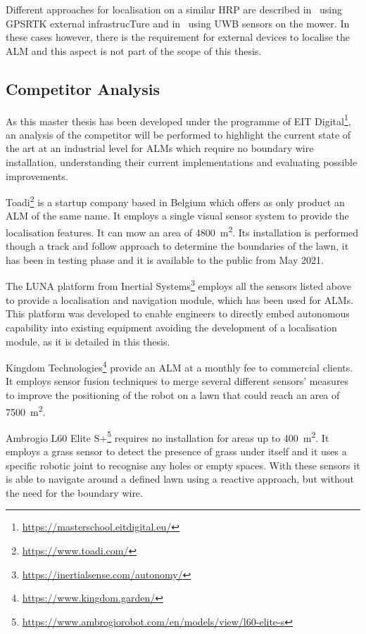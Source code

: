Different approaches for localisation on a similar \gls{HRP} are described in~\cite{oden_localization_2017} using \gls{GPSRTK} external infrastrucTure and in~\cite{lensund_local_2018} using \gls{UWB} sensors on the mower.
In these cases however, there is the requirement for external devices to localise the \gls{ALM} and this aspect is not part of the scope of this thesis. 


\subsection{Competitor Analysis}

\noindent As this master thesis has been developed under the programme of EIT Digital\footnote{\url{https://masterschool.eitdigital.eu/}}, an analysis of the competitor will be performed to highlight the current state of the art at an industrial level for \gls{ALM}s which require no boundary wire installation, understanding their current implementations and evaluating possible improvements.

Toadi\footnote{\url{https://www.toadi.com/}} is a startup company based in Belgium which offers as only product an \gls{ALM} of the same name. It employs a single visual sensor system to provide the localisation features. It can mow an area of \SI{4800}{\meter\squared}.
Its installation is performed though a track and follow approach to determine the boundaries of the lawn, it has been in testing phase and it is available to the public from May 2021.

The LUNA platform from Inertial Systems\footnote{\url{https://inertialsense.com/autonomy/}} employs all the sensors listed above to provide a localisation and navigation module, which has been used for \gls{ALM}s. This platform was developed to enable engineers to directly embed autonomous capability into existing equipment avoiding the development of a localisation module, as it is detailed in this thesis.

Kingdom Technologies\footnote{\url{https://www.kingdom.garden/}} provide an \gls{ALM} at a monthly fee to commercial clients.
It employs sensor fusion techniques to merge several different sensors' measures to improve the positioning of the robot on a lawn that could reach an area of \SI{7500}{\meter\squared}.

Ambrogio L60 Elite S+\footnote{\url{https://www.ambrogiorobot.com/en/models/view/l60-elite-s}} requires no installation for areas up to \SI{400}{\meter\squared}.
It employs a grass sensor to detect the presence of grass under itself and it uses a specific robotic joint to recognise any holes or empty spaces. With these sensors it is able to navigate around a defined lawn using a reactive approach, but without the need for the boundary wire.

